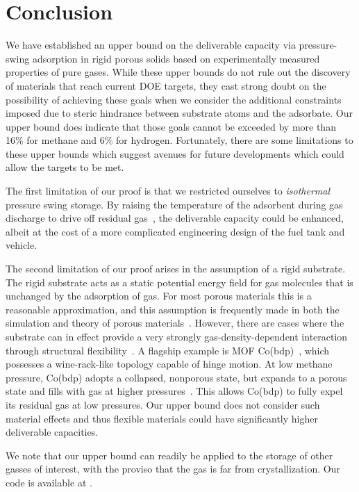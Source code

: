 \section{Conclusion}
We have established an upper bound on the deliverable capacity via pressure-swing adsorption in rigid porous solids based on experimentally measured properties of pure gases. While these upper bounds do not rule out the discovery of materials that reach current DOE targets, they cast strong doubt on the possibility of achieving these goals when we consider the additional constraints imposed due to steric hindrance between substrate atoms and the adsorbate. Our upper bound does indicate that those goals cannot be exceeded by more than 16\% for methane and 6\% for hydrogen. Fortunately, there are some limitations to these upper bounds which suggest avenues for future developments which could allow the targets to be met.

The first limitation of our proof is that we restricted ourselves to \emph{isothermal} pressure swing storage. By raising the temperature of the adsorbent during gas discharge to drive off residual gas~\cite{gomez2014exploring}, the deliverable capacity could be enhanced, albeit at the cost of a more complicated engineering design of the fuel tank and vehicle.

The second limitation of our proof arises in the assumption of a rigid substrate. The rigid substrate acts as a static potential energy field for gas molecules that is unchanged by the adsorption of gas.
For most porous materials this is a reasonable approximation, and this assumption is frequently made in both the simulation and theory of porous materials~\cite{witman2017influence}. However, there are cases where the substrate can in effect provide a very strongly gas-density-dependent interaction through structural flexibility~\cite{schneemann2014flexible}. A flagship example is MOF Co(bdp)~\cite{choi2008broadly}, which possesses a wine-rack-like topology capable of hinge motion. At low methane pressure, Co(bdp) adopts a collapsed, nonporous state, but expands to a porous state and fills with gas at higher pressures~\cite{mason2015methane}. This allows Co(bdp) to fully expel its residual gas at low pressures.
Our upper bound does not consider such material effects and thus flexible materials could have significantly higher deliverable capacities.

We note that our upper bound can readily be applied to the storage of other gasses of interest, with the proviso that the gas is far from crystallization. Our code is available at .
